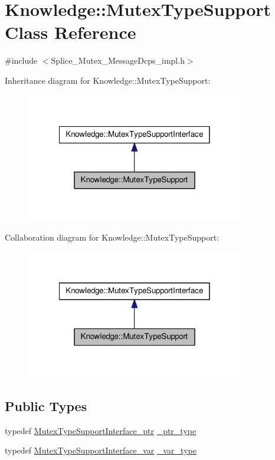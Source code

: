 \hypertarget{classKnowledge_1_1MutexTypeSupport}{
\section{Knowledge::MutexTypeSupport Class Reference}
\label{d3/d2e/classKnowledge_1_1MutexTypeSupport}
}


{\ttfamily \#include $<$Splice\_\-Mutex\_\-MessageDcps\_\-impl.h$>$}



Inheritance diagram for Knowledge::MutexTypeSupport:
\nopagebreak
\begin{figure}[H]
\begin{center}
\leavevmode
\includegraphics[width=270pt]{da/dab/classKnowledge_1_1MutexTypeSupport__inherit__graph}
\end{center}
\end{figure}


Collaboration diagram for Knowledge::MutexTypeSupport:
\nopagebreak
\begin{figure}[H]
\begin{center}
\leavevmode
\includegraphics[width=270pt]{d3/de5/classKnowledge_1_1MutexTypeSupport__coll__graph}
\end{center}
\end{figure}
\subsection*{Public Types}
\begin{DoxyCompactItemize}
\item 
typedef \hyperlink{classKnowledge_1_1MutexTypeSupportInterface}{MutexTypeSupportInterface\_\-ptr} \hyperlink{classKnowledge_1_1MutexTypeSupportInterface_a509c42b72d1043ac6b3cdbe678335f6f}{\_\-ptr\_\-type}
\item 
typedef \hyperlink{namespaceKnowledge_acaf157b3817dc52861f4ff75fcd3c2d4}{MutexTypeSupportInterface\_\-var} \hyperlink{classKnowledge_1_1MutexTypeSupportInterface_a62ca1346af2778b03bf35651e06ccadf}{\_\-var\_\-type}
\end{DoxyCompactItemize}

